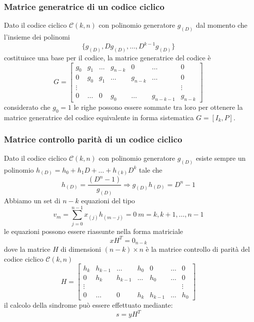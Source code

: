         \subsubsection{Matrice generatrice di un codice ciclico}
            Dato il codice ciclico $\mathcal{C}(k,n)$ con polinomio generatore $g_{(D)}$ dal momento che l'insieme dei polinomi
            \[
                \{g_{(D)},Dg_{(D)},\dots,D^{k-1}g_{(D)}\}  
            \]
            costituisce una base per il codice, la matrice generatrice del codice è 
            \[
                G = 
                \begin{bmatrix}
                g_0 & g_1 & \dots & g_{n-k} & 0 & \dots & 0\\ 
                0 & g_0 & g_1 & \dots & g_{n-k} & \dots & 0\\ 
                \vdots &  &  &  &  &  & \vdots\\ 
                0 & \dots & 0 & g_{0} & \dots & g_{n-k-1} & g_{n-k}
                \end{bmatrix}
            \]
            considerato che $g_0 = 1$ le righe possono essere sommate tra loro per ottenere la matrice generatrice del codice 
            equivalente in forma sistematica $G = [I_k,P]$.
        \subsubsection{Matrice controllo parità di un codice ciclico}
            Dato il codice ciclico $\mathcal{C}(k,n)$ con polinomio generatore $g_{(D)}$ esiste sempre un polinomio 
            $h_{(D)} = h_0+h_1D+\dots+h_{(k)}D^k$ tale che 
            \[
                h_{(D)} = \frac{(D^n-1)}{g_{(D)}} \Rightarrow g_{(D)}h_{(D)} = D^n-1    
            \]
            Abbiamo un set di $n-k$ equazioni del tipo 
            \[
                v_m =  \sum_{j=0}^{n-1}x_{(j)}h_{(m-j)} = 0\ m=k,k+1,\dots,n-1  
            \]
            le equazioni possono essere riassunte nella forma matriciale
            \[
                xH^T=0_{n-k}  
            \]
            dove la matrice $H$ di dimensioni $(n-k)\times n$ è la matrice controllo di parità del codice ciclico $\mathcal{C}(k,n)$ 
            \[
                H = 
                \begin{bmatrix}
                h_k & h_{k-1} & \dots & h_{0} & 0 & \dots & 0\\ 
                0 & h_k & h_{k-1} & \dots & h_{0} & \dots & 0\\ 
                \vdots &  &  &  &  &  & \vdots\\ 
                0 & \dots & 0 & h_{k}& h_{k-1} & \dots  & h_0
                \end{bmatrix}
            \]
            il calcolo della sindrome può essere effettuato mediante:
            \[
                s = yH^T    
            \]
